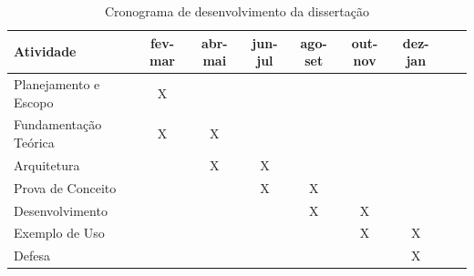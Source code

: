 \documentclass[12pt]{tcc}
\begin{document}
\begin{table}[!ht]
	\centering
	\caption{Cronograma de desenvolvimento da dissertação}
	\begin{tabular}{l  c  c  c  c  c  c L{1.5cm} R{1.5cm}}
		\toprule
		\textbf{Atividade} & \textbf{fev-mar} & \textbf{abr-mai} & \textbf{jun-jul} & \textbf{ago-set} & \textbf{out-nov} & \textbf{dez-jan} \\
		\midrule
		Planejamento e Escopo  &  X  &    &    &    &    &    \\
		Fundamentação Teórica  &  X  &  X  &    &    &    &    \\
		Arquitetura  &    &  X  &  X  &    &    &    \\
		Prova de Conceito  &    &    &  X  &  X  &    &    \\
		Desenvolvimento  &    &    &    &  X  &  X  &    \\
		Exemplo de Uso  &    &    &    &    &  X  &  X  \\
		Defesa  &    &    &    &    &    &  X  \\
		\bottomrule
	\end{tabular}
	\label{tab:cronograma}
\end{table}

\label{bibpage}
\renewcommand\bibname{Referências}

%

\label{bibfinalpage}

\label{lastpage}
\end{document}
